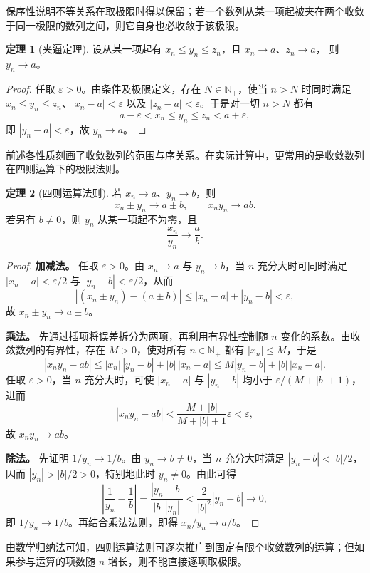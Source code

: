 \documentclass[UTF8, fontset=fandol, a4paper, 12pt]{ctexart}
\newcommand{\Nplus}{\mathbb N_{+}}
\theoremstyle{definition}
\newtheorem{theorem}{定理}
\begin{document}
保序性说明不等关系在取极限时得以保留；若一个数列从某一项起被夹在两个收敛于同一极限的数列之间，则它自身也必收敛于该极限。

\begin{theorem}[夹逼定理]
设从某一项起有 $x_n\le y_n\le z_n$，且 $x_n\to a$、$z_n\to a$，
则 $y_n\to a$。
\end{theorem}
\begin{proof}
任取 $\varepsilon>0$。由条件及极限定义，存在 $N\in\Nplus$，使当 $n>N$ 时同时满足 $x_n\le y_n\le z_n$、$|x_n-a|<\varepsilon$ 以及 $|z_n-a|<\varepsilon$。于是对一切 $n>N$ 都有
\[
 a-\varepsilon<x_n\le y_n\le z_n<a+\varepsilon,
\]
即 $|y_n-a|<\varepsilon$，故 $y_n\to a$。
\end{proof}

前述各性质刻画了收敛数列的范围与序关系。在实际计算中，更常用的是收敛数列在四则运算下的极限法则。

\begin{theorem}[四则运算法则]
若 $x_n\to a$、$y_n\to b$，则
\[
 x_n\pm y_n\to a\pm b,\qquad x_ny_n\to ab.
\]
若另有 $b\ne0$，则 $y_n$ 从某一项起不为零，且
\[
 \frac{x_n}{y_n}\longrightarrow\frac ab.
\]
\end{theorem}
\begin{proof}
\textbf{加减法。} 任取 $\varepsilon>0$。由 $x_n\to a$ 与 $y_n\to b$，当 $n$ 充分大时可同时满足 $|x_n-a|<\varepsilon/2$ 与 $|y_n-b|<\varepsilon/2$，从而
\[
 |(x_n\pm y_n)-(a\pm b)|\le |x_n-a|+|y_n-b|<\varepsilon,
\]
故 $x_n\pm y_n\to a\pm b$。

\textbf{乘法。} 先通过插项将误差拆分为两项，再利用有界性控制随 $n$ 变化的系数。由收敛数列的有界性，存在 $M>0$，使对所有 $n\in\Nplus$ 都有 $|x_n|\le M$，于是
\[
 |x_ny_n-ab|\le |x_n|\,|y_n-b|+|b|\,|x_n-a|
 \le M|y_n-b|+|b|\,|x_n-a|.
\]
任取 $\varepsilon>0$，当 $n$ 充分大时，可使 $|x_n-a|$ 与 $|y_n-b|$ 均小于 $\varepsilon/(M+|b|+1)$，进而
\[
 |x_ny_n-ab|<\frac{M+|b|}{M+|b|+1}\varepsilon<\varepsilon,
\]
故 $x_ny_n\to ab$。

\textbf{除法。} 先证明 $1/y_n\to 1/b$。由 $y_n\to b\ne0$，当 $n$ 充分大时满足 $|y_n-b|<|b|/2$，因而 $|y_n|>|b|/2>0$，特别地此时 $y_n\ne0$。由此可得
\[
 \left|\frac1{y_n}-\frac1b\right|
 =\frac{|y_n-b|}{|b|\,|y_n|}
 <\frac2{|b|^2}|y_n-b|\longrightarrow0,
\]
即 $1/y_n\to 1/b$。再结合乘法法则，即得 $x_n/y_n\to a/b$。
\end{proof}

由数学归纳法可知，四则运算法则可逐次推广到固定有限个收敛数列的运算；但如果参与运算的项数随 $n$ 增长，则不能直接逐项取极限。
\end{document}
